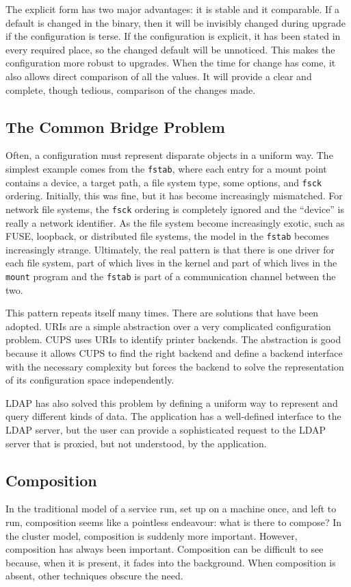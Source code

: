 \documentclass[letterpaper,twocolumn,10pt]{article}
\begin{document}
The explicit form has two major advantages: it is stable and it comparable. If a default is changed in the binary, then it will be invisibly changed during upgrade if the configuration is terse. If the configuration is explicit, it has been stated in every required place, so the changed default will be unnoticed. This makes the configuration more robust to upgrades. When the time for change has come, it also allows direct comparison of all the values. It will provide a clear and complete, though tedious, comparison of the changes made.

\subsection{The Common Bridge Problem}
Often, a configuration must represent disparate objects in a uniform way. The simplest example comes from the \texttt{fstab}, where each entry for a mount point contains a device, a target path, a file system type, some options, and \texttt{fsck} ordering.\cite{fstab} Initially, this was fine, but it has become increasingly mismatched. For network file systems, the \texttt{fsck} ordering is completely ignored and the ``device'' is really a network identifier. As the file system become increasingly exotic, such as FUSE, loopback, or distributed file systems, the model in the \texttt{fstab} becomes increasingly strange. Ultimately, the real pattern is that there is one driver for each file system, part of which lives in the kernel and part of which lives in the \texttt{mount} program and the \texttt{fstab} is part of a communication channel between the two.

This pattern repeats itself many times. There are solutions that have been adopted. URIs are a simple abstraction over a very complicated configuration problem. CUPS uses URIs to identify printer backends. The abstraction is good because it allows CUPS to find the right backend and define a backend interface with the necessary complexity but forces the backend to solve the representation of its configuration space independently.

LDAP has also solved this problem by defining a uniform way to represent and query different kinds of data. The application has a well-defined interface to the LDAP server, but the user can provide a sophisticated request to the LDAP server that is proxied, but not understood, by the application.

\subsection{Composition}
In the traditional model of a service run, set up on a machine once, and left to run, composition seems like a pointless endeavour: what is there to compose? In the cluster model, composition is suddenly more important. However, composition has always been important. Composition can be difficult to see because, when it is present, it fades into the background. When composition is absent, other techniques obscure the need.
\end{document}
